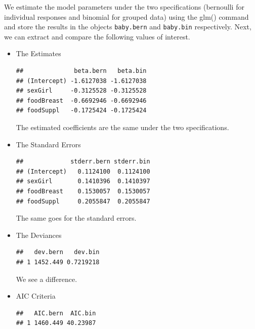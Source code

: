 \documentclass[a4paper,12pt]{article}\usepackage[]{graphicx}\usepackage[]{color}
\makeatletter
\newenvironment{kframe}{%
 \def\at@end@of@kframe{}%
 \ifinner\ifhmode%
  \def\at@end@of@kframe{\end{minipage}}%
  \begin{minipage}{\columnwidth}%
 \fi\fi%
 \def\FrameCommand##1{\hskip\@totalleftmargin \hskip-\fboxsep
 \colorbox{shadecolor}{##1}\hskip-\fboxsep
     \hskip-\linewidth \hskip-\@totalleftmargin \hskip\columnwidth}%
 \MakeFramed {\advance\hsize-\width
   \@totalleftmargin\z@ \linewidth\hsize
   \@setminipage}}%
 {\par\unskip\endMakeFramed%
 \at@end@of@kframe}
\newenvironment{knitrout}{}{} %
\makeatother
\begin{document}
\begin{enumerate}
{\color{blue}
\item We estimate the model parameters under the two specifications (bernoulli for individual responses and binomial for grouped data) using the glm() command and store the results in the objects \texttt{baby.bern} and \texttt{baby.bin} respectively. Next, we can extract and compare the following values of interest.
\begin{itemize} 
\item The Estimates 

\begin{knitrout}
\color{fgcolor}\begin{kframe}
\begin{verbatim}
##              beta.bern   beta.bin
## (Intercept) -1.6127038 -1.6127038
## sexGirl     -0.3125528 -0.3125528
## foodBreast  -0.6692946 -0.6692946
## foodSuppl   -0.1725424 -0.1725424
\end{verbatim}
\end{kframe}
\end{knitrout}
The estimated coefficients are the same under the two specifications. 
\item The Standard Errors 
\begin{knitrout}
\color{fgcolor}\begin{kframe}
\begin{verbatim}
##             stderr.bern stderr.bin
## (Intercept)   0.1124100  0.1124100
## sexGirl       0.1410396  0.1410397
## foodBreast    0.1530057  0.1530057
## foodSuppl     0.2055847  0.2055847
\end{verbatim}
\end{kframe}
\end{knitrout}
The same goes for the standard errors. 
\item The Deviances 
\begin{knitrout}
\color{fgcolor}\begin{kframe}
\begin{verbatim}
##   dev.bern   dev.bin
## 1 1452.449 0.7219218
\end{verbatim}
\end{kframe}
\end{knitrout}

We see a difference.

\item AIC Criteria 
\begin{knitrout}
\color{fgcolor}\begin{kframe}
\begin{verbatim}
##   AIC.bern  AIC.bin
## 1 1460.449 40.23987
\end{verbatim}
\end{kframe}
\end{knitrout}


\end{itemize}}
\end{enumerate}
\end{document}
